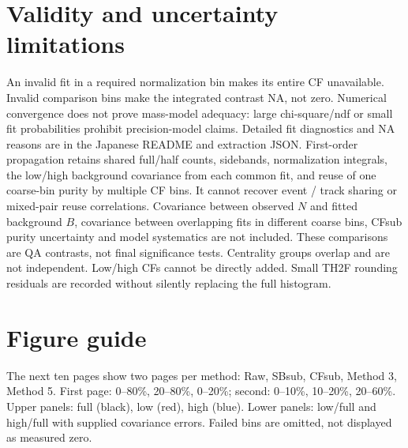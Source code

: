 \documentclass[10pt,a4paper]{article}
\begin{document}
\section{Validity and uncertainty limitations}
An invalid fit in a required normalization bin makes its entire CF unavailable. Invalid comparison bins make the integrated contrast NA, not zero. Numerical convergence does not prove mass-model adequacy: large chi-square/ndf or small fit probabilities prohibit precision-model claims. Detailed fit diagnostics and NA reasons are in the Japanese README and extraction JSON.
First-order propagation retains shared full/half counts, sidebands, normalization integrals, the low/high background covariance from each common fit, and reuse of one coarse-bin purity by multiple CF bins. It cannot recover event / track sharing or mixed-pair reuse correlations. Covariance between observed $N$ and fitted background $B$, covariance between overlapping fits in different coarse bins, CFsub purity uncertainty and model systematics are not included. These comparisons are QA contrasts, not final significance tests.
Centrality groups overlap and are not independent. Low/high CFs cannot be directly added. Small TH2F rounding residuals are recorded without silently replacing the full histogram.
\section{Figure guide}
The next ten pages show two pages per method: Raw, SBsub, CFsub, Method 3, Method 5. First page: 0--80\%, 20--80\%, 0--20\%; second: 0--10\%, 10--20\%, 20--60\%. Upper panels: full (black), low (red), high (blue). Lower panels: low/full and high/full with supplied covariance errors. Failed bins are omitted, not displayed as measured zero.





\end{document}
